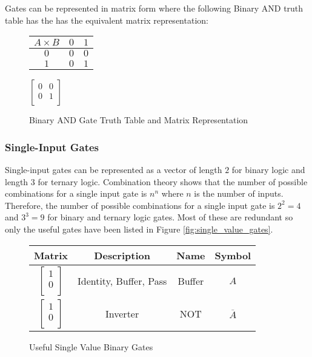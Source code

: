 \documentclass[12pt]{article}
\begin{document}
Gates can be represented in matrix form where the following Binary AND truth table has the has the equivalent matrix representation:\\
\begin{figure}[h]
    \centering
    \begin{minipage}{0.2\textwidth}
        \centering   
        \begin{tabular}{|c||c|c|}
            \hline
            $A \times B$ & $0$ & $1$ \\
            \hline\hline
            $0$ & $0$ & $0$ \\
            \hline
            $1$ & $0$ & $1$ \\
            \hline
        \end{tabular}
    \end{minipage}
    \begin{minipage}{0.2\textwidth}
        \centering   
        $\begin{bmatrix}
            0 & 0 \\
            0 & 1 \\
        \end{bmatrix}$
    \end{minipage}
    \caption{Binary AND Gate Truth Table and Matrix Representation}
    \label{fig:matrix_notation}
\end{figure}

\subsubsection{Single-Input Gates}

Single-input gates can be represented as a vector of length $2$ for binary logic and length $3$ for ternary logic. Combination theory 
shows that the number of possible combinations for a single input gate is $n^{n}$ where $n$ is the number of inputs. Therefore, the 
number of possible combinations for a single input gate is $2^{2} = 4$ and $3^3 = 9$ for binary and ternary logic gates. Most of these 
are redundant so only the useful gates have been listed in Figure \ref{fig:single_value_gates}.\\

\begin{figure}[h]
    \centering
    \begin{tabular}{c|c|c|c}
        Matrix & Description & Name & Symbol \\
        \hline
        $\begin{bmatrix}1 \\ 0 \\\end{bmatrix}$ & Identity, Buffer, Pass & Buffer & $A$ \\
        $\begin{bmatrix}1 \\ 0 \\\end{bmatrix}$ & Inverter & NOT & $\overline{A}$ \\
    \end{tabular}
    \caption{Useful Single Value Binary Gates}
    \label{fig:single_value_bin_gates}
\end{figure}
\end{document}
